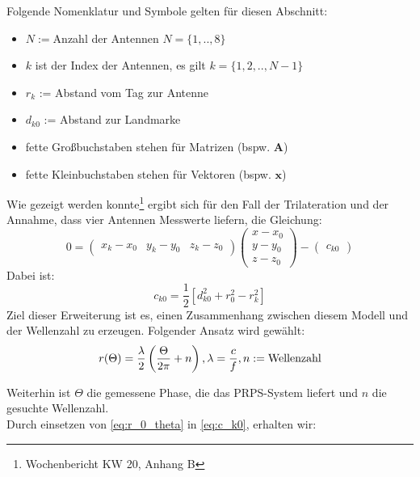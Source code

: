 {
\small
Folgende Nomenklatur und Symbole gelten für diesen Abschnitt:
\begin{itemize}[itemsep=0mm]
	\item	$N:=$Anzahl der Antennen $N=\{1,..,8\}$
	\item	$k$ ist der Index der Antennen, es gilt $k = \{1,2,..,N-1\}$
	\item	$r_{k}$ := Abstand vom Tag zur Antenne
	\item	$d_{k0}$ := Abstand zur Landmarke
	\item	fette Großbuchstaben stehen für Matrizen (bspw. $\mathbf{A}$)
	\item	fette Kleinbuchstaben stehen für Vektoren (bspw. $\mathbf{x}$)
	
\end{itemize}
%
Wie gezeigt werden konnte\footnote{Wochenbericht KW 20, Anhang B} ergibt sich für den Fall der Trilateration und der Annahme, dass vier Antennen Messwerte liefern, die Gleichung:
\begin{equation}\label{eq:final_trilateration_model}
0=
\left(
	\begin{array}{ccc}
		x_k-x_0 & y_k-y_0 & z_k-z_0 
	\end{array}
\right)
\left(
   \begin{array}{c}
	   x-x_0\\
	   y-y_0\\
	   z-z_0
   \end{array}
\right)
-
\left(
	\begin{array}{c}
		c_{k0}
	\end{array}
\right) 
\end{equation}
%
Dabei ist:
\begin{equation}\label{eq:c_k0}
	c_{k0}=\frac{1}{2}[d_{k0}^2+r_{0}^2-r_k^2]
\end{equation}
%
Ziel dieser Erweiterung ist es, einen Zusammenhang zwischen diesem Modell und der Wellenzahl zu erzeugen. Folgender Ansatz wird gewählt:
	\begin{equation}\label{eq:r_0_theta} r(\Theta)=\frac{\lambda}{2}\left(\frac{\Theta}{2\pi}+n\right),\\\lambda=\frac{c}{f}, n:= \text{Wellenzahl}
\end{equation}
%
%
\begin{shaded} 
Weiterhin ist $\Theta$ die gemessene Phase, die das PRPS-System liefert und $n$ die gesuchte Wellenzahl.\\
Durch einsetzen von \eqref{eq:r_0_theta} in \eqref{eq:c_k0}, erhalten wir:
\begin{equation}\label{eq:c_k0_extended}

\end{equation}
\end{shaded}}
